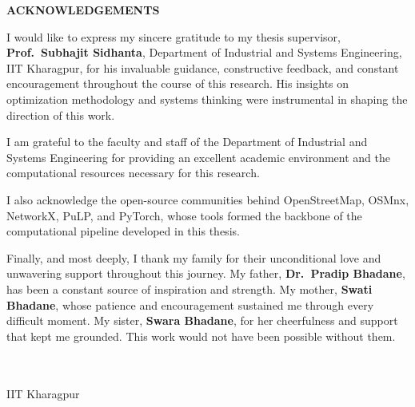 \thispagestyle{plain}

\begin{center}
 \Large {\bf \uppercase{Acknowledgements}}
\end{center}

\vspace{3\baselineskip}

\noindent
I would like to express my sincere gratitude to my thesis supervisor, \textbf{Prof.\ Subhajit Sidhanta}, Department of Industrial and Systems Engineering, IIT Kharagpur, for his invaluable guidance, constructive feedback, and constant encouragement throughout the course of this research. His insights on optimization methodology and systems thinking were instrumental in shaping the direction of this work.

\vspace{\baselineskip}

\noindent
I am grateful to the faculty and staff of the Department of Industrial and Systems Engineering for providing an excellent academic environment and the computational resources necessary for this research.

\vspace{\baselineskip}

\noindent
I also acknowledge the open-source communities behind OpenStreetMap, OSMnx, NetworkX, PuLP, and PyTorch, whose tools formed the backbone of the computational pipeline developed in this thesis.

\vspace{\baselineskip}

\noindent
Finally, and most deeply, I thank my family for their unconditional love and unwavering support throughout this journey. My father, \textbf{Dr.\ Pradip Bhadane}, has been a constant source of inspiration and strength. My mother, \textbf{Swati Bhadane}, whose patience and encouragement sustained me through every difficult moment. My sister, \textbf{Swara Bhadane}, for her cheerfulness and support that kept me grounded. This work would not have been possible without them.

\noindent
\vspace{\baselineskip} \\
\textbf{\myname} \\
IIT Kharagpur \\
\mydegreedate
